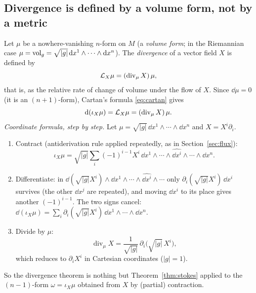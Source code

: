 \subsection{Divergence is defined by a volume form, not by a metric}\label{sec:divmu}

Let $\mu$ be a nowhere-vanishing $n$-form on $M$ (a \emph{volume form}; in the Riemannian case $\mu=\mathrm{vol}_g=\sqrt{|g|}\,\mathrm{d} x^1\wedge\cdots\wedge\mathrm{d} x^n$). The \emph{divergence} of a vector field $X$ is defined by
\begin{equation}\label{eq:Lmu}
\mathcal{L}_X\mu=(\operatorname{div}_\mu X)\,\mu,
\end{equation}
that is, as the relative rate of change of volume under the flow of $X$. Since $\dd\mu=0$ (it is an $(n+1)$-form), Cartan's formula \eqref{eq:cartan} gives
\begin{equation}\label{eq:divmu}
\mathrm{d}(\iota_X\mu)=\mathcal{L}_X\mu=(\operatorname{div}_\mu X)\,\mu .
\end{equation}
\emph{Coordinate formula, step by step.} Let $\mu=\sqrt{|g|}\,\dd x^1\wedge\cdots\wedge\dd x^n$ and $X=X^i\partial_i$.
\begin{enumerate}
\item Contract (antiderivation rule applied repeatedly, as in Section~\ref{sec:flux}): \[\iota_X\mu=\sqrt{|g|}\sum_i(-1)^{i-1}X^i\,\dd x^1\wedge\cdots\wedge\widehat{\dd x^i}\wedge\cdots\wedge\dd x^n.\]
\item Differentiate: in $\dd(\sqrt{|g|}X^i)\wedge\dd x^1\wedge\cdots\wedge\widehat{\dd x^i}\wedge\cdots$ only $\partial_i(\sqrt{|g|}X^i)\,\dd x^i$ survives (the other $\dd x^j$ are repeated), and moving $\dd x^i$ to its place gives another $(-1)^{i-1}$. The two signs cancel: $\dd(\iota_X\mu)=\sum_i\partial_i(\sqrt{|g|}X^i)\,\dd x^1\wedge\cdots\wedge\dd x^n$.
\item Divide by $\mu$:
\begin{equation}\label{eq:divcoord}
\operatorname{div}_\mu X=\frac1{\sqrt{|g|}}\,\partial_i\bigl(\sqrt{|g|}\,X^i\bigr),
\end{equation}
which reduces to $\partial_iX^i$ in Cartesian coordinates ($|g|=1$).
\end{enumerate}
So the divergence theorem is nothing but Theorem~\ref{thm:stokes} applied to the $(n-1)$-form $\omega=\iota_X\mu$ obtained from $X$ by (partial) contraction.
